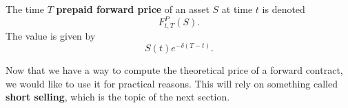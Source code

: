 \documentclass{ximera}
\begin{document}
\begin{definition}
The time $T$ {\bf prepaid forward price} of an asset $S$ at time $t$ is denoted
	\begin{equation*}
	F_{t,T}^P(S).
	\end{equation*}
The value is given by
	\begin{equation*}
	S(t)e^{-\delta(T-t)}.
	\end{equation*}
\end{definition}

Now that we have a way to compute the theoretical price of a forward contract, we would like to use it for practical reasons. This will rely on something called {\bf short selling}, which is the topic of the next section.
\end{document}
